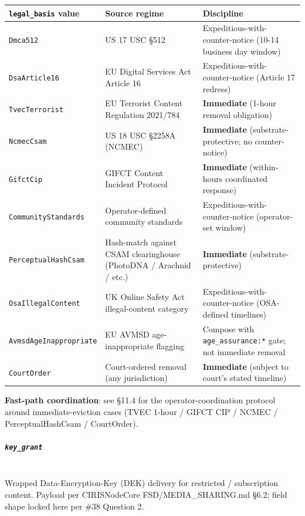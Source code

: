 \documentclass[11pt]{article}
\begin{document}
{\footnotesize
\begin{longtable}{|p{5.33cm}|p{5.33cm}|p{5.33cm}|}\hline
\textbf{\texttt{legal\_basis} value} & \textbf{Source regime} & \textbf{Discipline} \\ \hline\endhead
\texttt{Dmca512} & US 17 USC §512 & Expeditious-with-counter-notice (10-14 business day window) \\ \hline
\texttt{DsaArticle16} & EU Digital Services Act Article 16 & Expeditious-with-counter-notice (Article 17 redress) \\ \hline
\texttt{TvecTerrorist} & EU Terrorist Content Regulation 2021/784 & \textbf{Immediate} (1-hour removal obligation) \\ \hline
\texttt{NcmecCsam} & US 18 USC §2258A (NCMEC) & \textbf{Immediate} (substrate-protective; no counter-notice) \\ \hline
\texttt{GifctCip} & GIFCT Content Incident Protocol & \textbf{Immediate} (within-hours coordinated response) \\ \hline
\texttt{CommunityStandards} & Operator-defined community standards & Expeditious-with-counter-notice (operator-set window) \\ \hline
\texttt{PerceptualHashCsam} & Hash-match against CSAM clearinghouse (PhotoDNA / Arachnid / etc.) & \textbf{Immediate} (substrate-protective) \\ \hline
\texttt{OsaIllegalContent} & UK Online Safety Act illegal-content category & Expeditious-with-counter-notice (OSA-defined timelines) \\ \hline
\texttt{AvmsdAgeInappropriate} & EU AVMSD age-inappropriate flagging & Compose with \texttt{age\_assurance:*} gate; not immediate removal \\ \hline
\texttt{CourtOrder} & Court-ordered removal (any jurisdiction) & \textbf{Immediate} (subject to court's stated timeline) \\ \hline
\end{longtable}}



\textbf{Fast-path coordination}: see §11.4 for the operator-coordination protocol around immediate-eviction cases (TVEC 1-hour / GIFCT CIP / NCMEC / PerceptualHashCsam / CourtOrder).


\subparagraph{\texttt{key\_grant}}\mbox{}\\


Wrapped Data-Encryption-Key (DEK) delivery for restricted / subscription content. Payload per CIRISNodeCore FSD/MEDIA\_SHARING.md §6.2; field shape locked here per \#38 Question 2.
\end{document}
